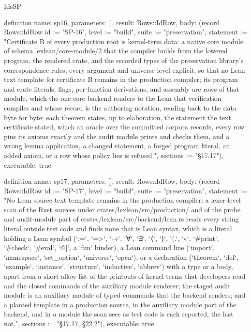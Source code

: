 \begin{lexlean}{IdsSP}
\begin{semanticmodule}
definition{
  name: sp16,
  parameters: [],
  result: Rows::IdRow,
  body: (record Rows::IdRow {id := "SP-16", level := "build", suite := "preservation", statement := "Certificate B of every production root is kernel-term data: a native core module of schema lexlean/core-module/2 that the compiler builds from the lowered program, the rendered crate, and the recorded types of the preservation library's correspondence rules, every argument and universe level explicit, so that no Lean text template for certificate B remains in the production compiler; its program and crate literals, flags, per-function derivations, and assembly are rows of that module, which the one core backend renders to the Lean that verification compiles and whose record is the authoring notation, reading back to the data byte for byte; each theorem states, up to elaboration, the statement the text certificate stated, which an oracle over the committed corpora records, every row pins its axioms exactly and the audit module prints and checks them, and a wrong lemma application, a changed statement, a forged program literal, an added axiom, or a row whose policy lies is refused.", sections := "§17.17"}),
  executable: true
}

definition{
  name: sp17,
  parameters: [],
  result: Rows::IdRow,
  body: (record Rows::IdRow {id := "SP-17", level := "build", suite := "preservation", statement := "No Lean source text template remains in the production compiler: a lexer-level scan of the Rust sources under crates/lexlean/src/production/ and of the probe and audit-module part of crates/lexlean/src/backend/lean.rs reads every string literal outside test code and finds none that is Lean syntax, which is a literal holding a Lean symbol (`:=`, `=>`, `→`, `∀`, `∃`, `⟨`, `⟩`, `(.`, `«`, `#print`, `#check`, `#eval`, `@[`, a `fun` binder), a Lean command line (`import`, `namespace`, `set_option`, `universe`, `open`), or a declaration (`theorem`, `def`, `example`, `instance`, `structure`, `inductive`, `abbrev`) with a type or a body, apart from a short allow-list of the printouts of kernel terms that developers read and the closed commands of the auxiliary module renderer; the staged audit module is an auxiliary module of typed commands that the backend renders; and a planted template in a production source, in the auxiliary module part of the backend, and in a module the scan sees as test code is each reported, the last not.", sections := "§17.17, §22.2"}),
  executable: true
}


\end{semanticmodule}
\end{lexlean}
